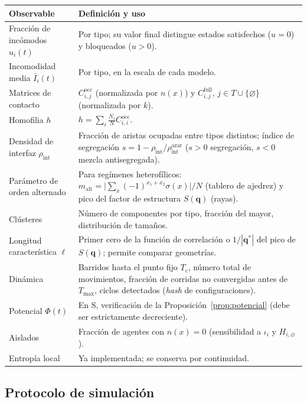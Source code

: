 \documentclass[11pt,a4paper]{article}
\theoremstyle{plain}
\theoremstyle{definition}
\theoremstyle{remark}
\newcommand{\vac}{\varnothing}
\newcommand{\modS}{\textsf{S}}
\begin{document}
\begin{longtable}{@{}p{4.2cm}p{10.3cm}@{}}
\toprule
Observable & Definición y uso \\
\midrule
\endhead
Fracción de incómodos $u_i(t)$ & Por tipo; su valor final distingue estados
satisfechos ($u=0$) y bloqueados ($u>0$). \\
Incomodidad media $\bar I_i(t)$ & Por tipo, en la escala de cada modelo. \\
Matrices de contacto & $C^{\mathrm{occ}}_{i,j}$ (normalizada por $n(x)$) y
$C^{\mathrm{full}}_{i,j}$, $j\in T\cup\{\vac\}$ (normalizada por $k$). \\
Homofilia $h$ & $h=\sum_i\frac{N_i}{N}C^{\mathrm{occ}}_{i,i}$. \\
Densidad de interfaz $\rho_{\mathrm{int}}$ & Fracción de aristas ocupadas entre
tipos distintos; índice de segregación
$s=1-\rho_{\mathrm{int}}/\rho_{\mathrm{int}}^{\mathrm{azar}}$ ($s>0$
segregación, $s<0$ mezcla antisegregada). \\
Parámetro de orden alternado & Para regímenes heterofílicos:
$m_{\mathrm{alt}}=\bigl|\sum_x(-1)^{x_1+x_2}\sigma(x)\bigr|/N$ (tablero de
ajedrez) y pico del factor de estructura $S(\mathbf q)$ (rayas). \\
Clústeres & Número de componentes por tipo, fracción del mayor, distribución
de tamaños. \\
Longitud característica $\ell$ & Primer cero de la función de correlación o
$1/|\mathbf q^*|$ del pico de $S(\mathbf q)$; permite comparar geometrías. \\
Dinámica & Barridos hasta el punto fijo $T_c$, número total de movimientos,
fracción de corridas no convergidas antes de $T_{\max}$, ciclos detectados
(\emph{hash} de configuraciones). \\
Potencial $\Phi(t)$ & En \modS, verificación de la Proposición~\ref{prop:potencial}
(debe ser estrictamente decreciente). \\
Aislados & Fracción de agentes con $n(x)=0$ (sensibilidad a $\iota_i$ y $H_{i,\vac}$). \\
Entropía local & Ya implementada; se conserva por continuidad. \\
\bottomrule
\end{longtable}

\subsection{Protocolo de simulación}
\end{document}
